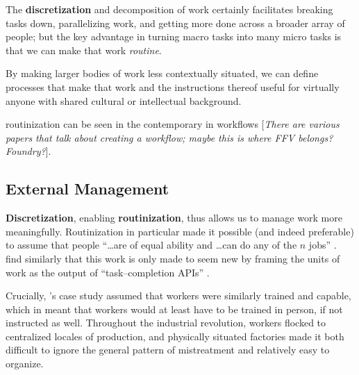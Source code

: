 \documentclass{sigchi}
\begin{document}
The \textbf{discretization} and decomposition of work certainly facilitates
breaking tasks down,
parallelizing work,
and getting more done across a broader array of people;
but the key advantage in turning macro tasks 
into many micro tasks is that we can make that work \textit{routine}.

By making larger bodies of work less contextually situated,
we can define processes that make that work
and the instructions thereof
useful for virtually anyone with shared cultural or intellectual background.

routinization can be seen in the contemporary in workflows
\cite{foundry,bernstein2015soylent}
[\textit{There are various papers that talk about creating a workflow;
maybe this is where FFV belongs? Foundry?}].



\subsection{External Management}
\textbf{Discretization}, enabling \textbf{routinization}, thus allows us to
manage work more meaningfully.
Routinization in particular made it possible
(and indeed preferable) to assume that people
``\dots are of equal ability and \dots can do any of the $n$ jobs''
\cite{hu1961parallel}.
\citeauthor{storiesIraniSilberman}
find similarly that
this work is only made to seem new by framing the units of work as the output of ``task--completion APIs''
\cite{storiesIraniSilberman}.

Crucially,
\citeauthor{hu1961parallel}'s case study assumed that workers were similarly trained and capable,
which in \citeyear{hu1961parallel}
meant that workers would at least have to be trained in person, if not instructed as well.
Throughout the industrial revolution, workers flocked to centralized locales of production,
and physically situated factories made it both
difficult to ignore the general pattern of mistreatment and
relatively easy to organize.
\end{document}
